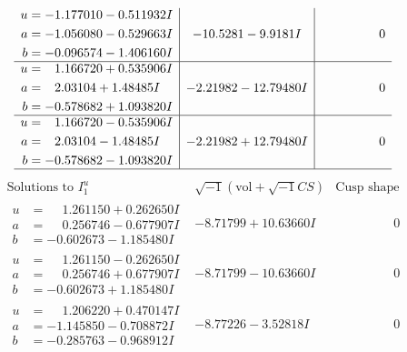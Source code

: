 \documentclass[1p]{elsarticle_modified}
\theoremstyle{definition}
\newcommand{\I}{\sqrt{-1}}
\begin{document}
$$\begin{array}{c|c|c}
\begin{aligned}
u &= -1.177010 - 0.511932 I \\
a &= -1.056080 - 0.529663 I \\
b &= -0.096574 - 1.406160 I\end{aligned}
 & -10.5281 - 9.9181 I & \phantom{-0.000000 } 0 \\ \hline\begin{aligned}
u &= \phantom{-}1.166720 + 0.535906 I \\
a &= \phantom{-}2.03104 + 1.48485 I \\
b &= -0.578682 + 1.093820 I\end{aligned}
 & -2.21982 - 12.79480 I & \phantom{-0.000000 } 0 \\ \hline\begin{aligned}
u &= \phantom{-}1.166720 - 0.535906 I \\
a &= \phantom{-}2.03104 - 1.48485 I \\
b &= -0.578682 - 1.093820 I\end{aligned}
 & -2.21982 + 12.79480 I & \phantom{-0.000000 } 0\\
 \hline 
 \end{array}$$\newpage$$\begin{array}{c|c|c}  
\text{Solutions to }I^u_{1}& \I (\text{vol} + \sqrt{-1}CS) & \text{Cusp shape}\\
 \hline 
\begin{aligned}
u &= \phantom{-}1.261150 + 0.262650 I \\
a &= \phantom{-}0.256746 - 0.677907 I \\
b &= -0.602673 - 1.185480 I\end{aligned}
 & -8.71799 + 10.63660 I & \phantom{-0.000000 } 0 \\ \hline\begin{aligned}
u &= \phantom{-}1.261150 - 0.262650 I \\
a &= \phantom{-}0.256746 + 0.677907 I \\
b &= -0.602673 + 1.185480 I\end{aligned}
 & -8.71799 - 10.63660 I & \phantom{-0.000000 } 0 \\ \hline\begin{aligned}
u &= \phantom{-}1.206220 + 0.470147 I \\
a &= -1.145850 - 0.708872 I \\
b &= -0.285763 - 0.968912 I\end{aligned}
 & -8.77226 - 3.52818 I & \phantom{-0.000000 } 0 \\ \hline\begin{aligned}

\end{aligned}
\end{array}$$
\end{document}

